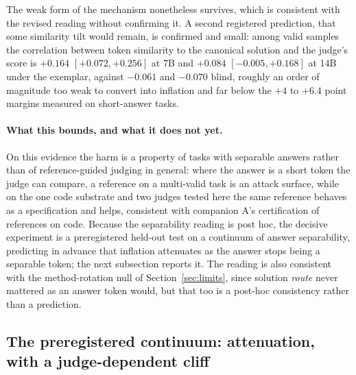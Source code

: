 \documentclass[11pt]{article}
\begin{document}
The weak form of the mechanism nonetheless survives, which is consistent with the revised reading without confirming it.
A second registered prediction, that some similarity tilt would remain, is confirmed and small: among valid samples the correlation between token similarity to the canonical solution and the judge's score is $+0.164$ $[+0.072, +0.256]$ at 7B and $+0.084$ $[-0.005, +0.168]$ at 14B under the exemplar, against $-0.061$ and $-0.070$ blind, roughly an order of magnitude too weak to convert into inflation and far below the $+4$ to $+6.4$ point margins measured on short-answer tasks.

\paragraph{What this bounds, and what it does not yet.}
On this evidence the harm is a property of tasks with separable answers rather than of reference-guided judging in general: where the answer is a short token the judge can compare, a reference on a multi-valid task is an attack surface, while on the one code substrate and two judges tested here the same reference behaves as a specification and helps, consistent with companion A's certification of references on code.
Because the separability reading is post hoc, the decisive experiment is a preregistered held-out test on a continuum of answer separability, predicting in advance that inflation attenuates as the answer stops being a separable token; the next subsection reports it.
The reading is also consistent with the method-rotation null of Section~\ref{sec:limits}, since solution \emph{route} never mattered as an answer token would, but that too is a post-hoc consistency rather than a prediction.

\subsection{The preregistered continuum: attenuation, with a judge-dependent cliff}
\label{sec:sepcont}
\end{document}
